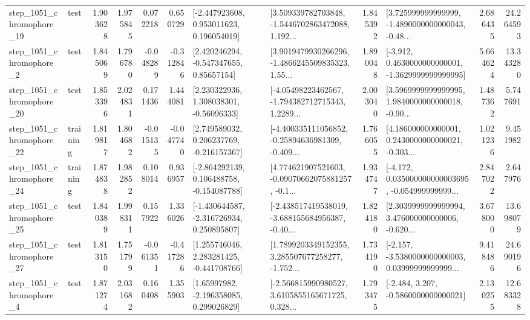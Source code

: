\begin{tabular}{llrrrrllrlrr}
 step\_1051\_chromophore\_19 &      test &      1.903628 &    1.975845 &      0.072218 &  0.650729 &    [-2.447923608, 0.953011623, 0.196054019] &  [3.509339782703848, -1.5446702863472088, 1.192... &       1.845392 &  [3.725999999999999, -1.4890000000000043, -0.48... &            2.686435 &         24.264593 \\
  step\_1051\_chromophore\_2 &      test &      1.845069 &    1.796780 &     -0.048289 & -0.312846 &     [2.420246294, -0.547347655, 0.85657154] &  [3.9019479930266296, -1.4866245509835323, 1.55... &       1.890048 &  [-3.912, 0.4630000000000001, -1.3629999999999995] &            5.664624 &         13.343280 \\
 step\_1051\_chromophore\_20 &      test &      1.853396 &    2.024831 &      0.171436 &  1.444081 &     [2.230322936, 1.308038301, -0.56096333] &  [-4.05498223462567, -1.794382712715343, 1.2289... &       2.003040 &  [3.5969999999999995, 1.9840000000000018, -0.90... &            1.487362 &          5.747691 \\
 step\_1051\_chromophore\_22 &  training &      1.819817 &    1.804682 &     -0.015135 & -0.047740 &    [2.749589032, 0.206237769, -0.216157367] &  [-4.400335111056852, -0.25894636981309, -0.409... &       1.766055 &  [4.186000000000001, 0.2430000000000021, -0.303... &            1.021236 &          9.451982 \\
 step\_1051\_chromophore\_24 &  training &      1.874838 &    1.982852 &      0.108014 &  0.936957 &   [-2.864292139, 0.106488758, -0.154087788] &  [4.774621907521603, -0.09070662075881257, -0.1... &       1.934747 &  [-4.172, 0.035000000000003695, -0.054999999999... &            2.847022 &          2.647976 \\
 step\_1051\_chromophore\_25 &      test &      1.840389 &    1.998311 &      0.157922 &  1.336026 &   [-1.430644587, -2.316726934, 0.250895807] &  [-2.438517419538019, -3.688155684956387, -0.40... &       1.824180 &  [2.3039999999999994, 3.476000000000006, -0.620... &            3.678000 &         13.698079 \\
 step\_1051\_chromophore\_27 &      test &      1.813150 &    1.751799 &     -0.061351 & -0.417286 &    [1.255746046, 2.283281425, -0.441708766] &  [1.7899203349152355, 3.285507677258277, -1.752... &       1.734190 &  [-2.157, -3.5380000000000003, 0.03999999999999... &            9.418486 &         24.690196 \\
  step\_1051\_chromophore\_4 &      test &      1.871274 &    2.031682 &      0.160408 &  1.355903 &     [1.65997982, -2.196358085, 0.299026829] &  [-2.566815990980527, 3.6105855165671725, 0.328... &       1.793475 &               [-2.484, 3.207, -0.5860000000000021] &            2.130255 &         12.683328 \\

\end{tabular}
